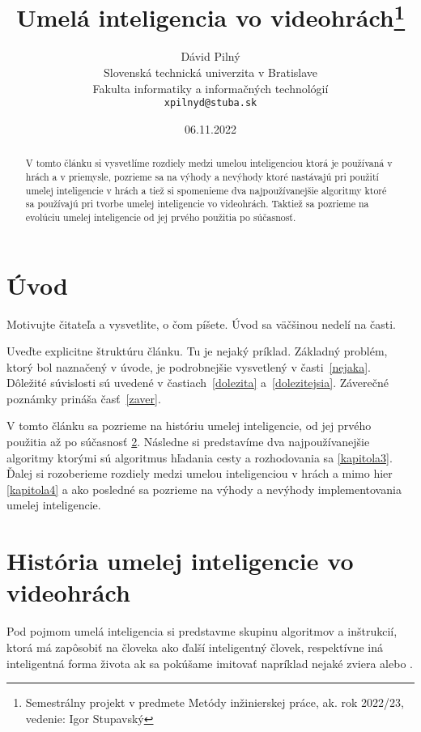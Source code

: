 \documentclass[10pt,oneside,slovak,a4paper]{article}
\title{Umelá inteligencia vo videohrách\thanks{Semestrálny projekt v predmete Metódy inžinierskej práce, ak. rok 2022/23, vedenie: Igor Stupavský}} %
\author{Dávid Pilný\\[2pt]
	{\small Slovenská technická univerzita v Bratislave}\\
	{\small Fakulta informatiky a informačných technológií}\\
	{\small \texttt{xpilnyd@stuba.sk}}
	}
\date{\small 06.11.2022} %
\begin{document}
\maketitle

\begin{abstract}
V tomto článku si vysvetlíme rozdiely medzi umelou inteligenciou ktorá je používaná v hrách a v priemysle, pozrieme sa na výhody a nevýhody ktoré nastávajú pri použití umelej inteligencie v hrách a tiež si spomenieme dva najpoužívanejšie algoritmy ktoré sa používajú pri tvorbe umelej inteligencie vo videohrách. Taktiež sa pozrieme na evolúciu umelej inteligencie od jej prvého použitia po súčasnosť.
\end{abstract}



\section{Úvod} \label{kapitola1}

Motivujte čitateľa a vysvetlite, o čom píšete. Úvod sa väčšinou nedelí na časti.

Uveďte explicitne štruktúru článku. Tu je nejaký príklad.
Základný problém, ktorý bol naznačený v úvode, je podrobnejšie vysvetlený v časti~\ref{nejaka}.
Dôležité súvislosti sú uvedené v častiach~\ref{dolezita} a~\ref{dolezitejsia}.
Záverečné poznámky prináša časť~\ref{zaver}.

V tomto článku sa pozrieme na históriu umelej inteligencie, od jej prvého použitia až po súčasnosť \ref{kapitola2}. Následne si predstavíme dva najpoužívanejšie algoritmy ktorými sú algoritmus hľadania cesty a rozhodovania sa \ref {kapitola3}. Ďalej si rozoberieme rozdiely medzi umelou inteligenciou v hrách a mimo hier \ref{kapitola4} a ako posledné sa pozrieme na výhody a nevýhody implementovania umelej inteligencie.



\section{História umelej inteligencie vo videohrách} \label{kapitola2}
Pod pojmom umelá inteligencia si predstavme skupinu algoritmov a inštrukcií, ktorá má zapôsobiť na človeka ako ďalší inteligentný človek, respektívne iná inteligentná forma života ak sa pokúšame imitovať napríklad nejaké zviera alebo .
\end{document}
